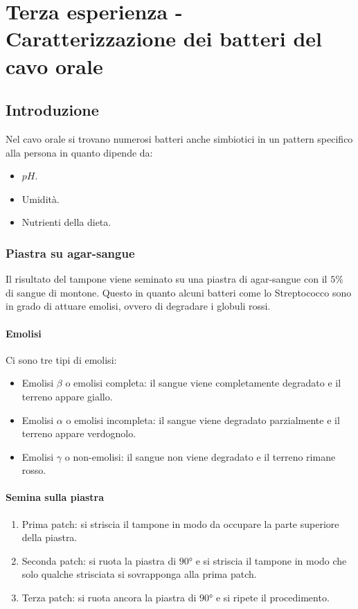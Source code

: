 \section{Terza esperienza - Caratterizzazione dei batteri del cavo orale}

	\subsection{Introduzione}
	Nel cavo orale si trovano numerosi batteri anche simbiotici in un pattern specifico alla persona in quanto dipende da:
	\begin{multicols}{3}
		\begin{itemize}
			\item $pH$.
			\item Umidit\`a.
			\item Nutrienti della dieta.
		\end{itemize}
	\end{multicols}
	
		\subsubsection{Piastra su agar-sangue}
		Il risultato del tampone viene seminato su una piastra di agar-sangue con il $5\%$ di sangue di montone. 
		Questo in quanto alcuni batteri come lo Streptococco sono in grado di attuare emolisi, ovvero di degradare i globuli rossi.

			\paragraph{Emolisi}
			Ci sono tre tipi di emolisi:
			\begin{itemize}
				\item Emolisi $\beta$ o emolisi completa: il sangue viene completamente degradato e il terreno appare giallo.
				\item Emolisi $\alpha$ o emolisi incompleta: il sangue viene degradato parzialmente e il terreno appare verdognolo.
				\item Emolisi $\gamma$ o non-emolisi: il sangue non viene degradato e il terreno rimane rosso.
			\end{itemize}

			\paragraph{Semina sulla piastra}
			\begin{enumerate}
				\item Prima patch: si striscia il tampone in modo da occupare la parte superiore della piastra.
				\item Seconda patch: si ruota la piastra di $90\si{\degree}$ e si striscia il tampone in modo che solo qualche strisciata si sovrapponga alla prima patch.
				\item Terza patch: si ruota ancora la piastra di $90\si{\degree}$ e si ripete il procedimento.
			\end{enumerate}

